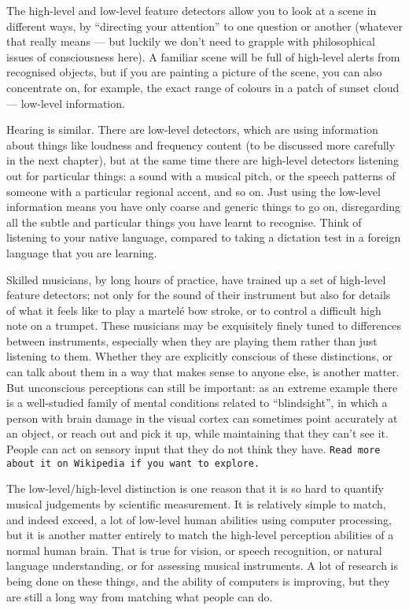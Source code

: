   The high-level and low-level feature detectors allow you to look at a scene 
  in different ways, by ``directing your attention'' to one question or another 
  (whatever that really means --- but luckily we don't need to grapple with 
  philosophical issues of consciousness here). A familiar scene will be full of 
  high-level alerts from recognised objects, but if you are painting a picture 
  of the scene, you can also concentrate on, for example, the exact range of 
  colours in a patch of sunset cloud --- low-level information. 

  Hearing is similar. There are low-level detectors, which are using 
  information about things like loudness and frequency content (to be discussed 
  more carefully in the next chapter), but at the same time there are 
  high-level detectors listening out for particular things: a sound with a 
  musical pitch, or the speech patterns of someone with a particular regional 
  accent, and so on. Just using the low-level information means you have only 
  coarse and generic things to go on, disregarding all the subtle and 
  particular things you have learnt to recognise. Think of listening to your 
  native language, compared to taking a dictation test in a foreign language 
  that you are learning. 

  Skilled musicians, by long hours of practice, have trained up a set of 
  high-level feature detectors; not only for the sound of their instrument but 
  also for details of what it feels like to play a martelé bow stroke, or to 
  control a difficult high note on a trumpet. These musicians may be 
  exquisitely finely tuned to differences between instruments, especially when 
  they are playing them rather than just listening to them. Whether they are 
  explicitly conscious of these distinctions, or can talk about them in a way 
  that makes sense to anyone else, is another matter. But unconscious 
  perceptions can still be important: as an extreme example there is a 
  well-studied family of mental conditions related to ``blindsight'', in which 
  a person with brain damage in the visual cortex can sometimes point 
  accurately at an object, or reach out and pick it up, while maintaining that 
  they can't see it. People can act on sensory input that they do not think 
  they have. \tt{}Read more about it on Wikipedia\rm{} if you want to explore. 

  The low-level/high-level distinction is one reason that it is so hard to 
  quantify musical judgements by scientific measurement. It is relatively 
  simple to match, and indeed exceed, a lot of low-level human abilities using 
  computer processing, but it is another matter entirely to match the 
  high-level perception abilities of a normal human brain. That is true for 
  vision, or speech recognition, or natural language understanding, or for 
  assessing musical instruments. A lot of research is being done on these 
  things, and the ability of computers is improving, but they are still a long 
  way from matching what people can do. 


